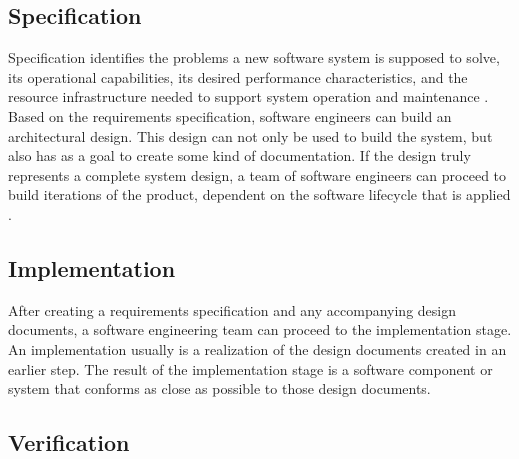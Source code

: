 \subsection{Specification}

Specification identifies the problems a new software system is supposed to solve, its operational capabilities, its desired performance characteristics, and the resource infrastructure needed to support system operation and maintenance \cite{ProcessModels}. Based on the requirements specification, software engineers can build an architectural design. This design can not only be used to build the system, but also has as a goal to create some kind of documentation. If the design truly represents a complete system design, a team of software engineers can proceed to build iterations of the product, dependent on the software lifecycle that is applied \cite{SoftwareDesign}.

\subsection{Implementation}

After creating a requirements specification and any accompanying design documents, a software engineering team can proceed to the implementation stage. An implementation usually is a realization of the design documents created in an earlier step. The result of the implementation stage is a software component or system that conforms as close as possible to those design documents.

\subsection{Verification}

